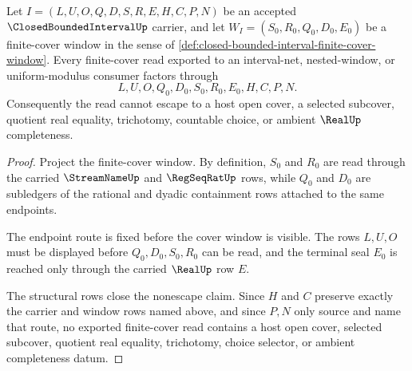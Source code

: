 \begin{theorem}
\label{thm:closed-bounded-interval-finite-cover-nonescape}
Let $I=(L,U,O,Q,D,S,R,E,H,C,P,N)$ be an accepted $\ClosedBoundedIntervalUp$ carrier, and let $W_I=(S_0,R_0,Q_0,D_0,E_0)$ be a finite-cover window in the sense of \autoref{def:closed-bounded-interval-finite-cover-window}. Every finite-cover read exported to an interval-net, nested-window, or uniform-modulus consumer factors through
$$
L,U,O,Q_0,D_0,S_0,R_0,E_0,H,C,P,N .
$$
Consequently the read cannot escape to a host open cover, a selected subcover, quotient real equality, trichotomy, countable choice, or ambient $\RealUp$ completeness.
\end{theorem}
\begin{proof}
Project the finite-cover window. By definition, $S_0$ and $R_0$ are read through the carried $\StreamNameUp$ and $\RegSeqRatUp$ rows, while $Q_0$ and $D_0$ are subledgers of the rational and dyadic containment rows attached to the same endpoints.

The endpoint route is fixed before the cover window is visible. The rows $L,U,O$ must be displayed before $Q_0,D_0,S_0,R_0$ can be read, and the terminal seal $E_0$ is reached only through the carried $\RealUp$ row $E$.

The structural rows close the nonescape claim. Since $H$ and $C$ preserve exactly the carrier and window rows named above, and since $P,N$ only source and name that route, no exported finite-cover read contains a host open cover, selected subcover, quotient real equality, trichotomy, choice selector, or ambient completeness datum.
\end{proof}

